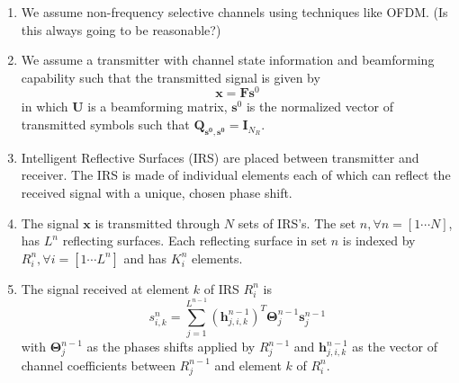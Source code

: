 \documentclass[12pt,a4paper]{report}
\begin{document}
\begin{enumerate}
\item 
	We assume non-frequency selective channels using techniques like OFDM. (Is this always going to be reasonable?)
	
\item 
	We assume a transmitter with channel state information and beamforming capability such that the transmitted signal is given by 
	\begin{equation}
	\mathbf{x} = \mathbf{F}\mathbf{s}^0
	\end{equation}
	in  which $\mathbf{U}$ is a beamforming matrix, $\mathbf{s}^0$ is the normalized vector of transmitted symbols such that $\mathbf{Q_{\mathbf{s}^0,\mathbf{s}^0}} = \mathbf{I}_{N_R}$. 
	
\item Intelligent Reflective Surfaces (IRS) are placed between transmitter and receiver. The IRS is made of individual elements each of which can reflect the received signal with a unique, chosen phase shift.


\item 
The signal $\mathbf{x}$ is transmitted through $N$ sets of IRS's. The set $n, \forall n = [1 \cdots N]$, has $L^n$ reflecting surfaces. Each reflecting surface in set $n$ is indexed by $R^n_{i}, \forall i = [1\cdots L^n]$ and has $K_{i}^{n}$ elements.
\item 
 The  signal received at element $k$ of IRS $R_i^n$ is 
\begin{equation}
s^{n}_{i,k} = \sum_{j = 1}^{L^{n-1}} (\mathbf{h}^{n-1}_{j,i,k})^T \boldsymbol{\Theta}^{n-1}_{j}\mathbf{s}^{n-1}_{j}
\end{equation}
with $\boldsymbol{\Theta}^{n-1}_{j}$ as the phases shifts applied by $R_j^{n-1}$ and $\mathbf{h}^{n-1}_{j,i,k}$ as the vector of channel coefficients between $R_j^{n-1}$ and element $k$ of $R_i^n$.


\end{enumerate}
\end{document}
